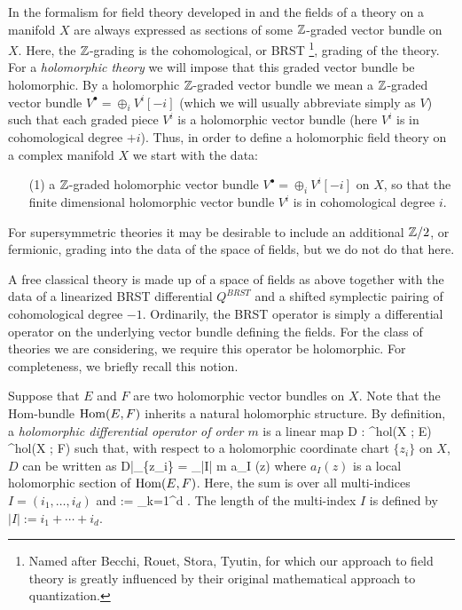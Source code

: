 \documentclass[10pt]{article}
\begin{document}
In the formalism for field theory developed in \cite{CosRenorm} and \cite{CG1, CG2} the fields of a theory on a manifold $X$ are always expressed as sections of some $\mathbb Z$-graded vector bundle on $X$.
Here, the $\mathbb Z$-grading is the cohomological, or BRST \footnote{Named after Becchi, Rouet, Stora, Tyutin, for which our approach to field theory is greatly influenced by their original mathematical approach to quantization.}, grading of the theory.
For a {\em holomorphic theory} we will impose that this graded vector bundle be holomorphic.  
By a holomorphic $\mathbb Z$-graded vector bundle we mean a $\mathbb Z$-graded vector bundle $
V^\bullet = \oplus_i V^i [-i]$ (which we will usually abbreviate simply as $V$) such that each graded piece $V^i$ is a holomorphic vector bundle (here $V^i$ is in cohomological degree $+i$).
Thus, in order to define a holomorphic field theory on a complex manifold $X$ we start with the data:

\begin{itemize}
\item[(1)] a $\mathbb Z$-graded holomorphic vector bundle $V^\bullet = \oplus_i V^i [-i]$ on $X$, so that the finite dimensional holomorphic vector bundle $V^i$ is in cohomological degree $i$. 
\end{itemize}

\begin{rmk}
For supersymmetric theories it may be desirable to include an additional $\mathbb Z/2$, or fermionic, grading into the data of the space of fields, but we do not do that here.
\end{rmk}

A free classical theory is made up of a space of fields as above together with the data of a linearized BRST differential $Q^{BRST}$ and a shifted symplectic pairing of cohomological degree $-1$. 
Ordinarily, the BRST operator is simply a differential operator on the underlying vector bundle defining the fields. 
For the class of theories we are considering, we require this operator be holomorphic. 
For completeness, we briefly recall this notion.

Suppose that $E$ and $F$ are two holomorphic vector bundles on $X$.
Note that the Hom-bundle ${\rm Hom}(E,F)$ inherits a natural holomorphic structure. 
By definition, a {\em holomorphic differential operator of order $m$} is a linear map
\ben
D : \Gamma^{hol}(X ; E) \to \Gamma^{hol}(X ; F)
\een
such that, with respect to a holomorphic coordinate chart $\{z_i\}$ on $X$, $D$ can be written as
\be\label{local holomorphic}
D|_{\{z_i\}} = \sum_{|I| \leq m} a_I (z) 
\ee
where $a_I(z)$ is a local holomorphic section of ${\rm Hom}(E,F)$.
Here, the sum is over all multi-indices $I = (i_1,\ldots, i_d)$ and 
\ben
{} := \prod_{k=1}^d  . 
\een 
The length of the multi-index $I$ is defined by $|I| := i_1 + \cdots + i_d$. 
\end{document}
